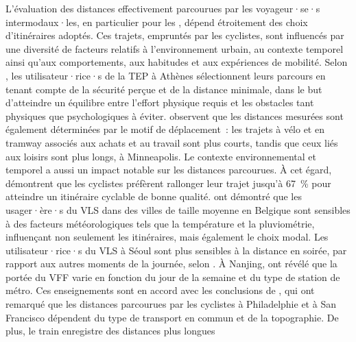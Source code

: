 \begin{refsegment}
L'évaluation des distances effectivement parcourues par les voyageur·se·s intermodaux·les, en particulier pour les , dépend étroitement des choix d'itinéraires adoptés. Ces trajets, empruntés par les cyclistes, sont influencés par une diversité de facteurs relatifs à l'environnement urbain, au contexte temporel ainsi qu'aux comportements, aux habitudes et aux expériences de mobilité. Selon \textcolor{blue}{\textcite[15]{tzouras_describing_2023}}, les utilisateur·rice·s de la \acrshort{TEP} à Athènes sélectionnent leurs parcours en tenant compte de la sécurité perçue et de la distance minimale, dans le but d'atteindre un équilibre entre l'effort physique requis et les obstacles tant physiques que psychologiques à éviter. \textcolor{blue}{\textcite[621]{krizek_detailed_2007}} observent que les distances mesurées sont également déterminées par le motif de déplacement~: les trajets à vélo et en tramway associés aux achats et au travail sont plus courts, tandis que ceux liés aux loisirs sont plus longs, à Minneapolis. Le contexte environnemental et temporel a aussi un impact notable sur les distances parcourues. À cet égard, \textcolor{blue}{\textcite[619]{krizek_detailed_2007}} démontrent que les cyclistes préfèrent rallonger leur trajet jusqu'à 67~\% pour atteindre un itinéraire cyclable de bonne qualité. \textcolor{blue}{\textcite[8]{adnan_last-mile_2019}} ont démontré que les usager·ère·s du \acrshort{VLS} dans des villes de taille moyenne en Belgique sont sensibles à des facteurs météorologiques tels que la température et la pluviométrie, influençant non seulement les itinéraires, mais également le choix modal. Les utilisateur·rice·s du \acrshort{VLS} à Séoul sont plus sensibles à la distance en soirée, par rapport aux autres moments de la journée, selon \textcolor{blue}{\autocite[3110]{cho_estimation_2022}}. À Nanjing, \textcolor{blue}{\textcite[11]{li_operating_2019}} ont révélé que la portée du \acrshort{VFF} varie en fonction du jour de la semaine et du type de station de métro. Ces enseignements sont en accord avec les conclusions de \textcolor{blue}{\textcite[105]{flamm_public_2014}}, qui ont remarqué que les distances parcourues par les cyclistes à Philadelphie et à San Francisco dépendent du type de transport en commun et de la topographie. De plus, le train enregistre des distances plus longues 
\end{refsegment}
